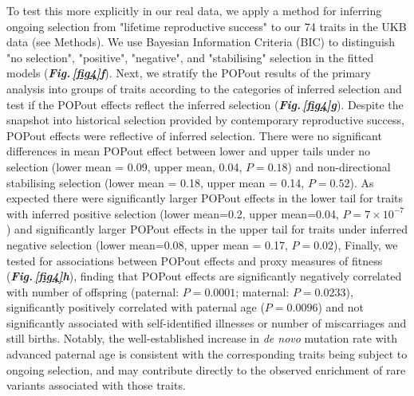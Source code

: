 \documentclass[12pt]{zHenriquesLab-StyleBioRxiv}
\newcommand\dref[2]{\normalsize{\textbf{\textit{Fig.\,\ref{#1}#2}}}\normalsize{}}
\begin{document}
\FloatBarrier
To test this more explicitly in our real data, we apply a 
method \cite{Sanjak2018} for inferring ongoing selection from 
"lifetime reproductive success" to our 74 traits in the UKB 
data (see Methods). We use Bayesian Information Criteria (BIC) 
to distinguish "no selection", "positive", "negative", and 
"stabilising" selection in the fitted models (\dref{fig4}{f}). 
Next, we stratify the POPout results of the primary analysis into 
groups of traits according to the categories of inferred selection and test if 
the POPout effects reflect the inferred selection (\dref{fig4}{g}). 
Despite the snapshot into historical selection provided by 
contemporary reproductive success, POPout effects were reflective 
of inferred selection. There were no significant differences in 
mean POPout effect between lower and upper tails under no selection 
(lower mean = 0.09, upper mean, 0.04, $P=0.18$) 
and non-directional stabilising selection (lower mean = 0.18, upper mean = 0.14, $P=0.52$). 
As expected there were significantly larger POPout effects in the lower tail 
for traits with inferred positive selection (lower mean=0.2, upper mean=0.04, $P=7 \times 10^{-7}$) 
and significantly larger POPout effects in the upper 
tail for traits under inferred negative selection (lower mean=0.08, upper mean = 0.17, $P=0.02$), 
Finally, we tested for associations between POPout effects and proxy measures of fitness (\dref{fig4}{h}), 
finding that POPout effects are significantly negatively correlated with number of 
offspring (paternal: $P=0.0001$; maternal: $P=0.0233$), significantly positively correlated 
with paternal age ($P=0.0096$) and not significantly associated with self-identified illnesses 
or number of miscarriages and still births. Notably, the well-established increase 
in \emph{de novo} mutation rate with advanced paternal age\cite{Kong2012} is consistent with the corresponding 
traits being subject to ongoing selection, and may contribute directly to the observed enrichment of rare 
variants associated with those traits.
% 
% 
% 
% 
% 
% 
% 
% 
% 
% 
% 
% 
% 
% 
% 
% 
% 
% 
% 
% 
% 
% 
% 
% 
% 
% 
% 
% 
% 
% 
% 
% 
% 
% 
% 
% 
% 
% 
% 
% 
% 
% 
% 
% 
% 
% 
% 
% 
% 
% 
\FloatBarrier
\end{document}
